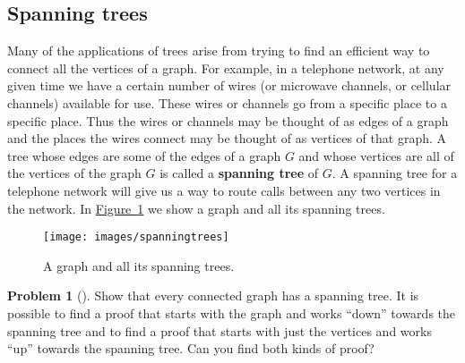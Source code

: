 \documentclass[10pt,]{book}
\newcommand{\terminology}[1]{\textbf{#1}}
\theoremstyle{plain}
\theoremstyle{definition}
\newtheorem{activity}[project]{Problem}
\theoremstyle{definition}
\numberwithin{equation}{chapter}
\begin{document}
\subsection[{Spanning trees}]{Spanning trees}\label{subsection-24}
\hypertarget{p-653}{}%
Many of the applications of trees arise from trying to find an efficient way to connect all the vertices of a graph. For example, in a telephone network, at any given time we have a certain number of wires (or microwave channels, or cellular channels) available for use. These wires or channels go from a specific place to a specific place. Thus the wires or channels may be thought of as edges of a graph and the places the wires connect may be thought of as vertices of that graph. A tree whose edges are some of the edges of a graph \(G\) and whose vertices are all of the vertices of the graph \(G\) is called a \terminology{spanning tree} of \(G\). A spanning tree for a telephone network will give us a way to route calls between any two vertices in the network. In \hyperref[spanningtrees]{Figure~\ref{spanningtrees}} we show a graph and all its spanning trees.%
\begin{figure}
\centering
\texttt{[image: images/spanningtrees]}
\caption{A graph and all its spanning trees.\label{spanningtrees}}
\end{figure}
\begin{activity}[]\marginsymbol[-1em]{} \label{activity-117}
\hypertarget{p-654}{}%
Show that every connected graph has a spanning tree. It is possible to find a proof that starts with the graph and works ``down'' towards the spanning tree and to find a proof that starts with just the vertices and works ``up'' towards the spanning tree. Can you find both kinds of proof?%
\end{activity}
\typeout{************************************************}
\typeout{************************************************}
\end{document}
